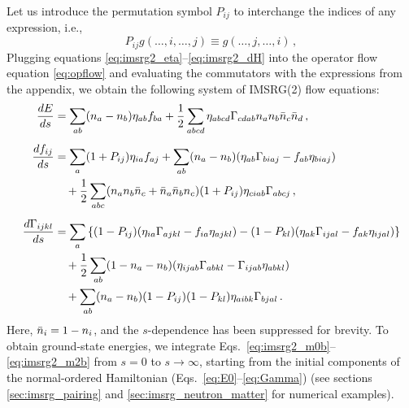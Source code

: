 Let us introduce the permutation symbol $P_{ij}$ to interchange the 
indices of any expression, i.e.,
\begin{equation}\label{eq:def_Pij}
  P_{ij} g(\ldots,i,\ldots,j) \equiv g(\ldots,j,\ldots,i)\,,
\end{equation}
Plugging equations \eqref{eq:imsrg2_eta}--\eqref{eq:imsrg2_dH} into 
the operator flow equation \eqref{eq:opflow} and evaluating the 
commutators with the expressions from the appendix, we obtain the 
following system of IMSRG(2) flow equations:
\begin{align}
  \totd{E}{s}&= \sum_{ab}(n_a-n_b)\eta_{ab} f_{ba} 
    + \frac{1}{2} \sum_{abcd}\eta_{abcd}\Gamma_{cdab} n_a n_b\bar{n}_c\bar{n}_d
    \label{eq:imsrg2_m0b}\,,\\[5pt]
% 
  \totd{f_{ij}}{s} &= 
  \sum_{a}(1+P_{ij})\eta_{ia}f_{aj} +\sum_{ab}(n_a-n_b)(\eta_{ab}\Gamma_{biaj}-f_{ab}\eta_{biaj}) \notag\\ 
  &\quad +\frac{1}{2}\sum_{abc}(n_an_b\bar{n}_c+\bar{n}_a\bar{n}_bn_c) (1+P_{ij})\eta_{ciab}\Gamma_{abcj}
  \label{eq:imsrg2_m1b}\,,\\[5pt]
% 
  \totd{\Gamma_{ijkl}}{s}&= 
  \sum_{a}\left\{ 
    (1-P_{ij})(\eta_{ia}\Gamma_{ajkl}-f_{ia}\eta_{ajkl} )
    -(1-P_{kl})(\eta_{ak}\Gamma_{ijal}-f_{ak}\eta_{ijal} )
    \right\}\notag \\
  &\quad+ \frac{1}{2}\sum_{ab}(1-n_a-n_b)(\eta_{ijab}\Gamma_{abkl}-\Gamma_{ijab}\eta_{abkl})
    \notag\\
  &\quad+\sum_{ab}(n_a-n_b) (1-P_{ij})(1-P_{kl})\eta_{aibk}\Gamma_{bjal}
    \label{eq:imsrg2_m2b}\,.
\end{align}
Here, $\bar{n}_i=1-n_i$, and the $s$-dependence has been suppressed for brevity. 
To obtain ground-state energies, we integrate Eqs.~\eqref{eq:imsrg2_m0b}--\eqref{eq:imsrg2_m2b} 
from $s=0$ to $s\to\infty$, starting from the initial components of the 
normal-ordered Hamiltonian (Eqs.~\eqref{eq:E0}--\eqref{eq:Gamma})
(see sections \ref{sec:imsrg_pairing} and \ref{sec:imsrg_neutron_matter} 
for numerical examples).

